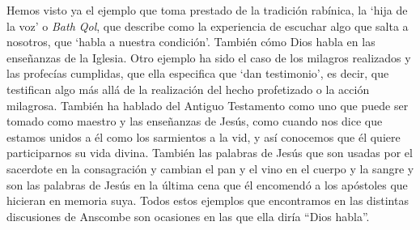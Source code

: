 Hemos visto ya el ejemplo que toma prestado de la tradición rabínica, la `hija de la voz' o \emph{Bath Qol}, que describe como la experiencia de escuchar algo que salta a nosotros, que `habla a nuestra condición'. También cómo Dios habla en las enseñanzas de la Iglesia. Otro ejemplo ha sido el caso de los milagros realizados y las profecías cumplidas, que ella especifica que `dan testimonio', es decir, que testifican algo más allá de la realización del hecho profetizado o la acción milagrosa. También ha hablado del Antiguo Testamento como uno que puede ser tomado como maestro y las enseñanzas de Jesús, como cuando nos dice que estamos unidos a él como los sarmientos a la vid, y así conocemos que él quiere participarnos su vida divina. También las palabras de Jesús que son usadas por el sacerdote en la consagración y cambian el pan y el vino en el cuerpo y la sangre y son las palabras de Jesús en la última cena que él encomendó a los apóstoles que hicieran en memoria suya. Todos estos ejemplos que encontramos en las distintas discusiones de Anscombe son ocasiones en las que ella diría ``Dios habla''.


